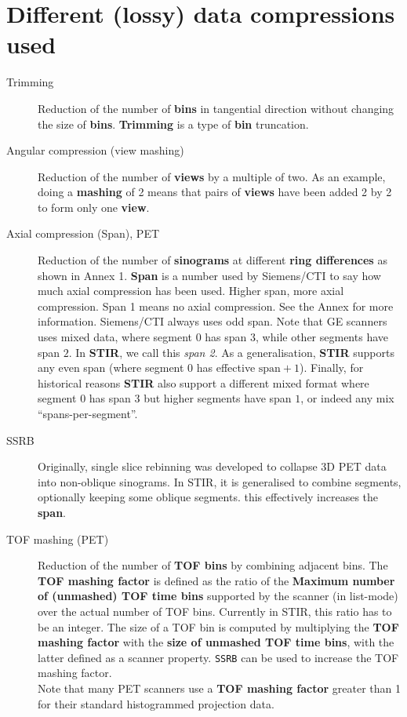 \documentclass{article}
\begin{document}
\section*{Different (lossy) data compressions used}
\begin{description}

\item[Trimming] 
Reduction of the number of \textbf{bins} in tangential direction without 
changing the size of \textbf{bins}. \textbf{Trimming} is a type of \textbf{bin} 
truncation.

\item[Angular compression (view mashing)] 
Reduction of the number of \textbf{views} by a multiple of two. As 
an example, doing a \textbf{mashing} of 2 means that pairs of \textbf{views} 
have been added 2 by 2 to form only one \textbf{view}.

\item[Axial compression (Span), PET] 
Reduction of the number of \textbf{sinograms} at different \textbf{ring 
differences} as shown in Annex 1. \textbf{Span} is a number used by 
Siemens/CTI to say how much axial compression has been used. 
Higher span, more axial compression. Span 1 means 
no axial compression. See the Annex for more information.
Siemens/CTI always uses odd span. 
Note that GE scanners uses mixed data, 
where segment $0$ has span $3$, while other segments have span $2$. 
In \textbf{STIR}, we call this \textit{span 2}. As a generalisation,
\textbf{STIR} supports any even span (where segment $0$ has effective
$\mathrm{span}+1$).
Finally, for historical reasons \textbf{STIR} also support a different mixed
format where segment $0$ has span $3$ but higher segments have span $1$,
or indeed any mix ``spans-per-segment''.

\item[SSRB]
Originally, single slice rebinning was developed to collapse 3D PET data into non-oblique sinograms.
In STIR, it is generalised to combine segments, optionally keeping some oblique segments.
this effectively increases the \textbf{span}.

\item[TOF mashing (PET)]
Reduction of the number of \textbf{TOF bins} by combining adjacent bins. The \textbf{TOF mashing factor}
is defined as the ratio of the \textbf{Maximum number of (unmashed) TOF time bins} supported
by the scanner (in list-mode) over the actual number of TOF bins. Currently in STIR, this
ratio has to be an integer. The size of a TOF bin is computed by multiplying the
\textbf{TOF mashing factor} with the \textbf{size of unmashed TOF time bins}, with the latter
defined as a scanner property. \texttt{SSRB} can be used to increase the TOF mashing factor.\\
Note that many PET scanners use a \textbf{TOF mashing factor} greater than 1
for their standard histogrammed projection data.

\end{description}
\end{document}
